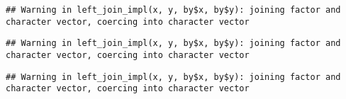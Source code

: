 \documentclass[10pt]{report}
\newenvironment{Shaded}{}{}
\newcommand{\KeywordTok}[1]{\textcolor[rgb]{0.00,0.44,0.13}{\textbf{{#1}}}}
\newcommand{\DataTypeTok}[1]{\textcolor[rgb]{0.56,0.13,0.00}{{#1}}}
\newcommand{\StringTok}[1]{\textcolor[rgb]{0.25,0.44,0.63}{{#1}}}
\newcommand{\NormalTok}[1]{{#1}}
\begin{document}
\begin{verbatim}
## Warning in left_join_impl(x, y, by$x, by$y): joining factor and character vector, coercing into character vector
\end{verbatim}

\begin{Shaded}
\end{Shaded}

\begin{verbatim}
## Warning in left_join_impl(x, y, by$x, by$y): joining factor and character vector, coercing into character vector
\end{verbatim}

\begin{verbatim}
## Warning in left_join_impl(x, y, by$x, by$y): joining factor and character vector, coercing into character vector
\end{verbatim}

\begin{Shaded}
\end{Shaded}
\end{document}
